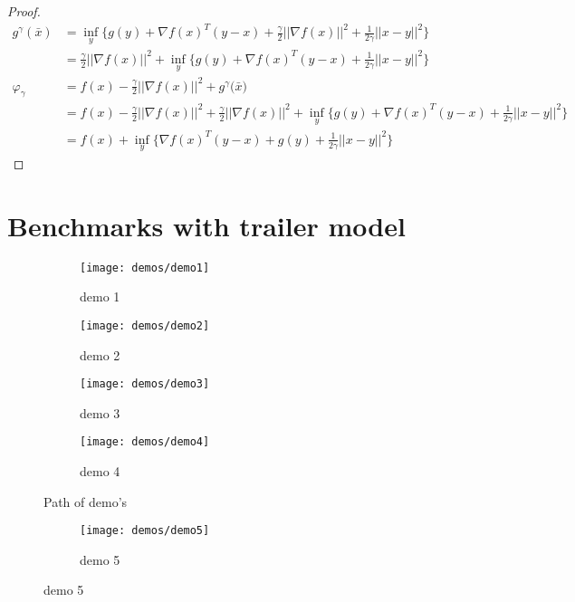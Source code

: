 \begin{proof}
\begin{align*}
	g^{\gamma} (\bar{x})
	&=\underset{y}{\inf} \Big\{g(y)+ \nabla f(x)^T(y-x) +\frac{\gamma}{2}||\nabla f(x)||^2 + \frac{1}{2 \gamma} ||x-y||^2  \Big\} \\
	&= \frac{\gamma}{2}||\nabla f(x)||^2 + \underset{y}{\inf} \Big\{g(y)+ \nabla f(x)^T(y-x) + \frac{1}{2 \gamma} ||x-y||^2  \Big\} \\
	\varphi_{\gamma} 
	&= f(x) - \frac{\gamma}{2}||\nabla f(x)||^2 + g^{\gamma} \big(\bar{x} \big)\\
	&= f(x) - \frac{\gamma}{2}||\nabla f(x)||^2 +  \frac{\gamma}{2}||\nabla f(x)||^2 + \underset{y}{\inf} \Big\{g(y)+ \nabla f(x)^T(y-x) + \frac{1}{2 \gamma} ||x-y||^2  \Big\}\\
	&=   f(x) + \underset{y}{\inf} \Big\{ \nabla f(x)^T(y-x) + g(y) + \frac{1}{2 \gamma} ||x-y||^2  \Big\} 
	\end{align*}
	\label{prf:FBE alterative expression}
\end{proof}

\chapter{Benchmarks with trailer model}
\label{appendix:paths trailer simulations}

\begin{figure}[H]
	\centering
	\begin{subfigure}[b]{0.40\textwidth}
		\centering
		\texttt{[image: demos/demo1]}
		\caption{demo 1}
		\label{fig:demo 1}
	\end{subfigure}
	\hfill
	\begin{subfigure}[b]{0.40\textwidth}
		\centering
		\texttt{[image: demos/demo2]}
		\caption{demo 2}
		\label{fig:demo 2}
	\end{subfigure}
	\begin{subfigure}[b]{0.40\textwidth}
		\centering
		\texttt{[image: demos/demo3]}
		\caption{demo 3}
		\label{fig:demo 3}
	\end{subfigure}
	\hfill
	\begin{subfigure}[b]{0.40\textwidth}
		\centering
		\texttt{[image: demos/demo4]}
		\caption{demo 4}
		\label{fig:demo 4}
	\end{subfigure}
	\caption{Path of demo's}
	\label{fig:demos}
\end{figure}
\begin{figure}[H]
	\centering
	\begin{subfigure}[b]{0.45\textwidth}
		\centering
		\texttt{[image: demos/demo5]}
		\caption{demo 5}
		\label{fig:demo 5}
	\end{subfigure}
\end{figure}

